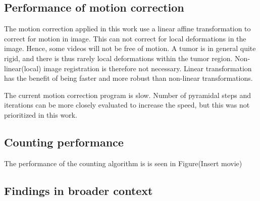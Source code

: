 \subsection{Performance of motion correction}
The motion correction applied in this work use a linear affine transformation to correct for motion in image. This can not correct for local deformations in the image. Hence, some videos will not be free of motion. A tumor is in general quite rigid, and there is thus rarely local deformations within the tumor region. Non-linear(local) image registration is therefore not necessary. Linear transformation has the benefit of being faster and more robust than non-linear transformations. 

The current motion correction program is slow. Number of pyramidal steps and iterations can be more closely evaluated to increase the speed, but this was not prioritized in this work. 

\subsection{Counting performance}

The performance of the counting algorithm is is seen in Figure(Insert movie)

\subsection{Findings in broader context}


